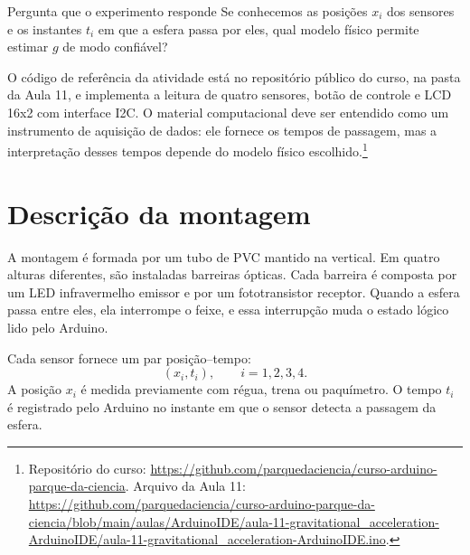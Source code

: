 \documentclass[11pt,a4paper]{article}
\begin{document}
\begin{caixaIdeia}{Pergunta que o experimento responde}
Se conhecemos as posições $x_i$ dos sensores e os instantes $t_i$ em que a esfera passa por eles, qual modelo físico permite estimar $g$ de modo confiável?
\end{caixaIdeia}

O código de referência da atividade está no repositório público do curso, na pasta da Aula 11, e implementa a leitura de quatro sensores, botão de controle e LCD 16x2 com interface I2C. O material computacional deve ser entendido como um instrumento de aquisição de dados: ele fornece os tempos de passagem, mas a interpretação desses tempos depende do modelo físico escolhido.\footnote{Repositório do curso: \url{https://github.com/parquedaciencia/curso-arduino-parque-da-ciencia}. Arquivo da Aula 11: \url{https://github.com/parquedaciencia/curso-arduino-parque-da-ciencia/blob/main/aulas/ArduinoIDE/aula-11-gravitational_acceleration-ArduinoIDE/aula-11-gravitational_acceleration-ArduinoIDE.ino}.}

\section{Descrição da montagem}

A montagem é formada por um tubo de PVC mantido na vertical. Em quatro alturas diferentes, são instaladas barreiras ópticas. Cada barreira é composta por um LED infravermelho emissor e por um fototransistor receptor. Quando a esfera passa entre eles, ela interrompe o feixe, e essa interrupção muda o estado lógico lido pelo Arduino.

Cada sensor fornece um par posição--tempo:
\[
(x_i,t_i), \qquad i=1,2,3,4.
\]
A posição $x_i$ é medida previamente com régua, trena ou paquímetro. O tempo $t_i$ é registrado pelo Arduino no instante em que o sensor detecta a passagem da esfera.
\end{document}
